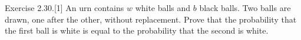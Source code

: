 \item
	Exercise 2.30.[1] An urn contains $w$ white balls and $b$ black balls. Two balls
	are drawn, one after the other, without replacement. Prove that the
	probability that the first ball is white is equal to the probability that the
	second is white.
